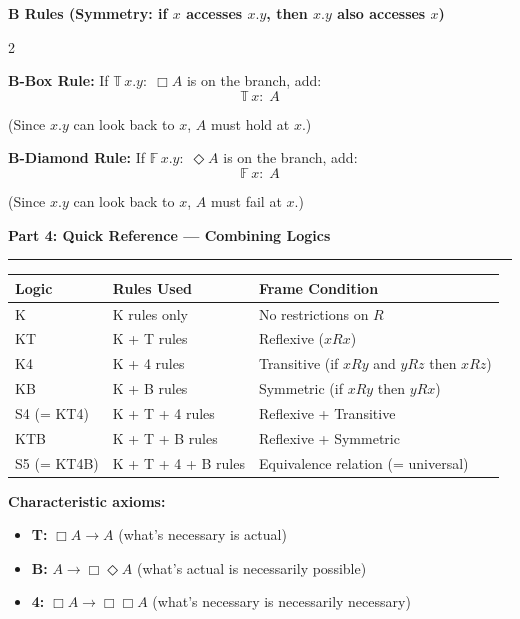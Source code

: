 \documentclass[10pt]{article}
\newcommand{\T}{\mathbb{T}}
\newcommand{\F}{\mathbb{F}}
\newcommand{\ruleheader}[1]{\medskip\noindent\textbf{\large #1}\par\smallskip\hrule\smallskip}
\newcommand{\rulesubheader}[1]{\smallskip\noindent\textbf{#1}\par\smallskip}
\begin{document}
\bigskip

\rulesubheader{B Rules (Symmetry: if $x$ accesses $x.y$, then $x.y$ also accesses $x$)}

\begin{multicols}{2}

\textbf{B-Box Rule:} If $\T\, x.y{:}\; \Box A$ is on the branch, add:
$$\T\, x{:}\; A$$

(Since $x.y$ can look back to $x$, $A$ must hold at $x$.)

\columnbreak

\textbf{B-Diamond Rule:} If $\F\, x.y{:}\; \Diamond A$ is on the branch, add:
$$\F\, x{:}\; A$$

(Since $x.y$ can look back to $x$, $A$ must fail at $x$.)

\end{multicols}

\bigskip
\ruleheader{Part 4: Quick Reference --- Combining Logics}

\begin{center}
\begin{tabular}{lll}
\toprule
\textbf{Logic} & \textbf{Rules Used} & \textbf{Frame Condition} \\
\midrule
K & K rules only & No restrictions on $R$ \\
KT & K + T rules & Reflexive ($xRx$) \\
K4 & K + 4 rules & Transitive (if $xRy$ and $yRz$ then $xRz$) \\
KB & K + B rules & Symmetric (if $xRy$ then $yRx$) \\
S4 (= KT4) & K + T + 4 rules & Reflexive + Transitive \\
KTB & K + T + B rules & Reflexive + Symmetric \\
S5 (= KT4B) & K + T + 4 + B rules & Equivalence relation (= universal) \\
\bottomrule
\end{tabular}
\end{center}

\bigskip

\textbf{Characteristic axioms:}
\begin{itemize}[nosep]
\item \textbf{T:} $\Box A \rightarrow A$ \quad (what's necessary is actual)
\item \textbf{B:} $A \rightarrow \Box\Diamond A$ \quad (what's actual is necessarily possible)
\item \textbf{4:} $\Box A \rightarrow \Box\Box A$ \quad (what's necessary is necessarily necessary)
\end{itemize}
\end{document}
